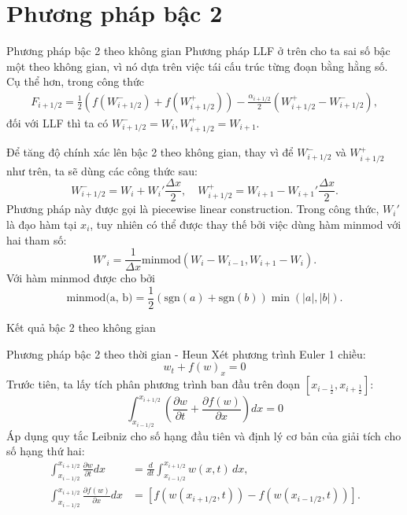 \documentclass[aspectratio=43,10pt]{beamer}
\begin{document}
\section{Phương pháp bậc 2}

\begin{frame}{Phương pháp bậc 2 theo không gian}
Phương pháp LLF ở trên cho ta sai số bậc một theo không gian, vì nó dựa trên việc tái cấu trúc từng đoạn bằng hằng số. Cụ thể hơn, trong công thức
\begin{equation*}
\begin{aligned}
    F_{i+1/2} = \frac{1}{2} \left( f(W_{i+1/2}^-) + f(W_{i+1/2}^+) \right) - \frac{\alpha_{i+1/2}}{2} (W_{i+1/2}^+ - W_{i+1/2}^-),
\end{aligned}
\end{equation*}
đối với LLF thì ta có $W_{i+1/2}^- = W_i, W_{i+1/2}^+ = W_{i+1}$.

Để tăng độ chính xác lên bậc 2 theo không gian, thay vì để $W_{i+1/2}^-$ và $W_{i+1/2}^+$ như trên, ta sẽ dùng các công thức sau:
\[
W_{i+1/2}^- = W_i + W_i' \frac{\Delta x}{2}, \quad W_{i+1/2}^+ = W_{i+1} - W_{i+1}' \frac{\Delta x}{2}.
\]
Phương pháp này được gọi là piecewise linear construction.
Trong công thức, $W_i'$ là đạo hàm tại $x_i$, tuy nhiên có thể được thay thế bởi việc dùng hàm minmod với hai tham số:
\[
W'_i = \frac{1}{\Delta x}\text{minmod}(W_i - W_{i-1}, W_{i+1} - W_i).
\]
Với hàm minmod được cho bởi
\[
\text{minmod(a, b)} = \dfrac{1}{2}(\text{sgn}(a) + \text{sgn}(b)) \min(|a|, |b|).
\]
\end{frame}

\begin{frame}{Kết quả bậc 2 theo không gian}
\begin{center}
\scalebox{0.6}{}
\end{center}
\end{frame}

\begin{frame}{Phương pháp bậc 2 theo thời gian - Heun}
Xét phương trình Euler 1 chiều:
\begin{equation*}
    w_t + f(w)_x = 0
\end{equation*}
Trước tiên, ta lấy tích phân phương trình ban đầu trên đoạn $[x_{i-\frac{1}{2}}, x_{i+\frac{1}{2}}]$:
\[
\int_{x_{i-1/2}}^{x_{i+1/2}} \left( \frac{\partial w}{\partial t} + \frac{\partial f(w)}{\partial x} \right) dx = 0
\]
Áp dụng quy tắc Leibniz cho số hạng đầu tiên và định lý cơ bản của giải tích cho số hạng thứ hai:
\begin{align*}
        \int_{x_{i-1/2}}^{x_{i+1/2}}  \frac{\partial w}{\partial t} dx &= \frac{d}{dt} \int_{x_{i-1/2}}^{x_{i+1/2}} w(x,t) \, dx, \\
        \int_{x_{i-1/2}}^{x_{i+1/2}} \frac{\partial f(w)}{\partial x}  dx &= \left[ f(w(x_{i+1/2}, t)) - f(w(x_{i-1/2}, t)) \right].
\end{align*}
\end{frame}
\end{document}

